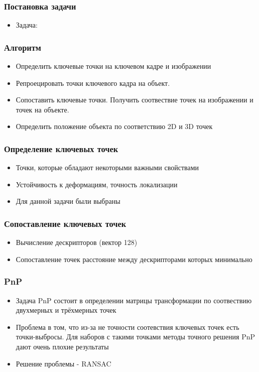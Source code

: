 \begin{frame}\frametitle{Постановка задачи}
    \begin{itemize}
        \item Задача: 
    \end{itemize}
\end{frame}
\begin{frame}\frametitle{Алгоритм}
    \begin{itemize}
        \item Определить ключевые точки на ключевом кадре и изображении
        \item Репроецировать точки ключевого кадра на объект.
        \item Сопоставить ключевые точки. Получить соотвествие 
            точек на изображении и точек на объекте.
        \item Определить положение объекта по соответствию 2D и 3D точек
    \end{itemize}
\end{frame}
\begin{frame}\frametitle{Определение ключевых точек}
    \begin{itemize}
        \item Точки, которые обладают некоторыми важными свойствами
        \item Устойчивость к деформациям, точность локализации
        \item Для данной задачи были выбраны
    \end{itemize}
\end{frame}
\begin{frame}\frametitle{Сопоставление ключевых точек}
    \begin{itemize}
        \item Вычисление дескрипторов (вектор 128)
        \item Сопоставление точек расстояние между дескрипторами которых минимально
    \end{itemize}
\end{frame}
\begin{frame}\frametitle{PnP}
    \begin{itemize}
        \item Задача PnP состоит в определении матрицы трансформации по соотвествию двухмерных и трёхмерных точек
        \item Проблема в том, что из-за не точности соотевствия ключевых точек есть точки-выбросы. 
            Для наборов с такими точками методы точного решения PnP дают очень плохие результаты
        \item Решение проблемы - RANSAC
    \end{itemize}
\end{frame}
